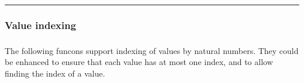 

\begin{center}
\rule{3in}{0.4pt}
\end{center}

\subsubsection{Value indexing}\hypertarget{value-indexing}{}\label{value-indexing}

\begin{align*}
  [ \
  \KEY{Entity} \quad & \NAMEREF{value-index} \\
  \KEY{Funcon} \quad & \NAMEREF{initialise-index} \\
  \KEY{Funcon} \quad & \NAMEREF{allocate-index} \\
  \KEY{Funcon} \quad & \NAMEREF{lookup-index}
  \ ]
\end{align*}
The following funcons support indexing of values by natural numbers.
They could be enhanced to ensure that each value has at most one index,
and to allow finding the index of a value.

